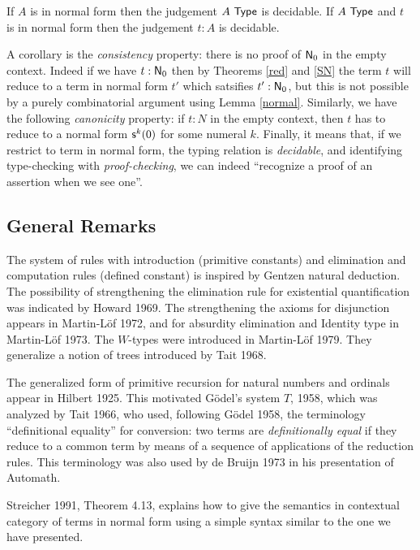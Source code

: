 {\begin{thm}
If $A$ is in normal form then the 
judgement $A~{\sf Type}$ is decidable. If $A~{\sf Type}$ and $t$ is in normal form then the judgement
$t:A$ is decidable.
\end{thm}


 A corollary is the {\em consistency} property: there is no proof of ${\sf N}_0$ in the empty
context. Indeed if we have $t:{\sf N}_0$ then by Theorems \ref{red} and \ref{SN} the term $t$ will reduce
to a term in normal form $t'$ which satsifies $t':{\sf N}_0$, but this is not possible by a 
purely combinatorial argument using Lemma \ref{normal}. Similarly, we have the following
{\em canonicity} property: if $t:N$ in the empty context, then $t$ has to reduce to a
normal form ${\sf s}^k(0)$ for some numeral $k$. Finally, it means that, if we restrict to term
in normal form, the typing relation is {\em decidable}, and identifying type-checking with
{\em proof-checking}, we can indeed ``recognize a proof of an assertion when we see one''.

\subsection*{General Remarks}


 The system of rules with introduction (primitive constants) and elimination and computation rules
(defined constant) is inspired by Gentzen natural deduction. The possibility of strengthening
the elimination rule for existential quantification was indicated by Howard 1969. The strengthening
the axioms for disjunction appears in Martin-L\"of 1972, and for absurdity elimination and Identity type
in Martin-L\"of 1973. The $W$-types were introduced in Martin-L\"of 1979. They generalize a notion
of trees introduced by Tait 1968.%

 The generalized form of primitive recursion for natural numbers and ordinals appear in Hilbert 1925.
This motivated G\"odel's system $T$, 1958, which was analyzed by Tait 1966, who used, following
G\"odel 1958, the terminology
``definitional equality'' for conversion: two terms are {\em definitionally equal} if they reduce
to a common term by means of a sequence of applications of the reduction rules. This terminology was
also used by de Bruijn 1973 in his presentation of Automath.

 Streicher 1991, Theorem 4.13, explains how to give the semantics in contextual category of terms in normal
form using a simple syntax similar to the one we have presented.

}
%  


